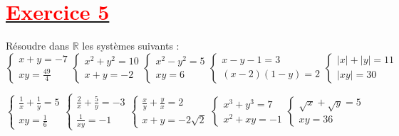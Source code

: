 \documentclass[12pt]{article}
\begin{document}
\section*{\underline{\textbf{\textcolor{red}{Exercice 5}}}}
Résoudre dans $\mathbb{R}$ les systèmes suivants :\\
\begin{equation*}
\begin{cases}
x + y = -7 \\
xy = \frac{49}{4}
\end{cases}
\begin{cases}
x^{2} + y^{2} = 10 \\
x+y = -2
\end{cases}
\begin{cases}
x^{2} - y^{2} = 5 \\
xy = 6
\end{cases}
\begin{cases}
x-y-1 = 3 \\
(x-2)(1-y) = 2
\end{cases}
\begin{cases}
|x| + |y| = 11 \\
|xy| = 30
\end{cases}
\end{equation*}

\begin{equation*}
\begin{cases}
\frac{1}{x} + \frac{1}{y} = 5 \\
xy = \frac{1}{6}
\end{cases}
\begin{cases}
\frac{2}{x} + \frac{5}{y} = -3 \\
\frac{1}{xy}=-1
\end{cases}
\begin{cases}
\frac{x}{y} + \frac{y}{x} = 2 \\
x+y = -2\sqrt{2}
\end{cases}
\begin{cases}
x^{3}+y^{3}= 7 \\
x^{2}+xy = -1
\end{cases}
\begin{cases}
\sqrt{x} + \sqrt{y} = 5 \\
xy = 36
\end{cases}
\end{equation*}
\end{document}
